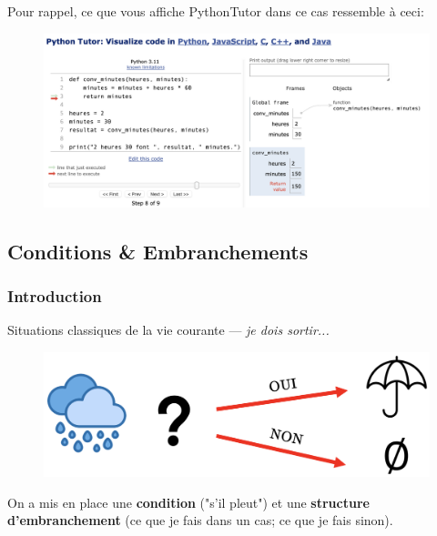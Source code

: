 \documentclass[12pt]{article}
\begin{document}
	Pour rappel, ce que vous affiche PythonTutor dans ce cas ressemble à ceci:
	
	\begin{figure}[H]
		\centering
		\includegraphics[width=\textwidth]{010_PythonTutor.png}
	\end{figure}
	
	\noindent
	
	\subsection{Conditions \& Embranchements}
	\nopagebreak
	\subsubsection*{Introduction}
	\nopagebreak
	Situations classiques de la vie courante --- \textit{je dois sortir...}
	\nopagebreak
	\begin{figure}[H]
		\centering
		\includegraphics[width=\textwidth]{011_ConditionPluie.png}
	\end{figure}
	
	On a mis en place une \textbf{condition} ("s'il pleut") et une \textbf{structure d'embranchement} (ce que je fais dans un cas; ce que je fais sinon).
	
\end{document}
